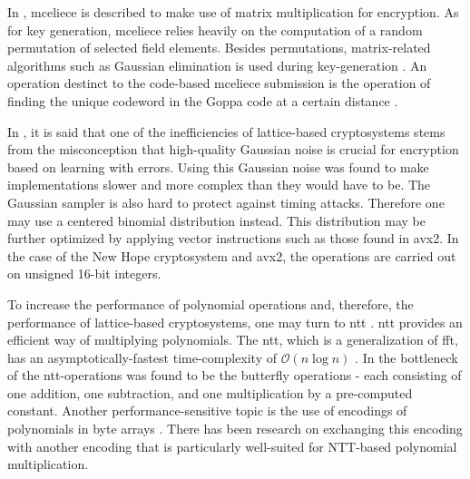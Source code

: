 

In \cite{wang2018}, \gls{mceliece} is described to make use of matrix multiplication for encryption. As for key generation, \gls{mceliece} relies heavily on the computation of a random permutation of selected field elements. Besides permutations, matrix-related algorithms such as Gaussian elimination is used during key-generation \cite{mceliece2020}. An operation destinct to the code-based \gls{mceliece} submission is the operation of finding the unique codeword in the Goppa code at a certain distance \cite{mceliece2020}.


In \cite{alkim2016}, it is said that one of the inefficiencies of lattice-based cryptosystems stems from the misconception that high-quality Gaussian noise is crucial for encryption based on learning with errors. Using this Gaussian noise was found to make implementations slower and more complex than they would have to be. The Gaussian sampler is also hard to protect against timing attacks. Therefore one may use a centered binomial distribution instead. This distribution may be further optimized by applying vector instructions such as those found in \gls{avx2}. In the case of the New Hope cryptosystem and \gls{avx2}, the operations are carried out on unsigned 16-bit integers.

To increase the performance of polynomial operations and, therefore, the performance of lattice-based cryptosystems, one may turn to \gls{ntt} \cite{alkim2016}. \gls{ntt} provides an efficient way of multiplying polynomials. The \gls{ntt}, which is a generalization of \gls{fft}, has an asymptotically-fastest time-complexity of $\mathcal{O}(n\log{}n)$ \cite{roy2020}. In \cite{alkim2016} the bottleneck of the \gls{ntt}-operations was found to be the butterfly operations - each consisting of one addition, one subtraction, and one multiplication by a pre-computed constant. Another performance-sensitive topic is the use of encodings of polynomials in byte arrays \cite{alkim2016}. There has been research on exchanging this encoding with another encoding that is particularly well-suited for NTT-based polynomial multiplication.

